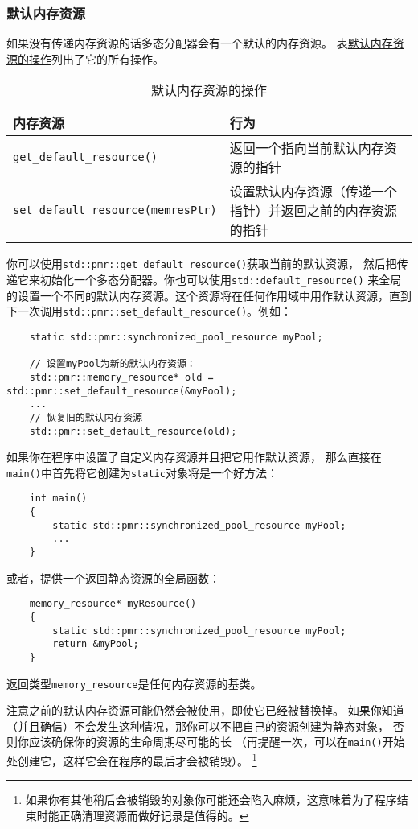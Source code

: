 \subsubsection{默认内存资源}
如果没有传递内存资源的话多态分配器会有一个默认的内存资源。
表\hyperref[t29.2]{默认内存资源的操作}列出了它的所有操作。
\begin{table}[htb]
    \centering
    \begin{tabular}{l|p{}}
        \hline
        \textbf{内存资源}                              & \textbf{行为}                   \\
        \hline
        \texttt{get\_default\_resource()}          & 返回一个指向当前默认内存资源的指针             \\
        \texttt{set\_default\_resource(memresPtr)} & 设置默认内存资源（传递一个指针）并返回之前的内存资源的指针 \\
        \hline
    \end{tabular}
    \caption{默认内存资源的操作}
    \label{t29.2}
\end{table}

你可以使用\texttt{std::pmr::get\_default\_resource()}获取当前的默认资源，
然后把传递它来初始化一个多态分配器。你也可以使用\texttt{std::default\_resource()}
来全局的设置一个不同的默认内存资源。这个资源将在任何作用域中用作默认资源，直到
下一次调用\texttt{std::pmr::set\_default\_resource()}。例如：
\begin{lstlisting}
    static std::pmr::synchronized_pool_resource myPool;

    // 设置myPool为新的默认内存资源：
    std::pmr::memory_resource* old = std::pmr::set_default_resource(&myPool);
    ...
    // 恢复旧的默认内存资源
    std::pmr::set_default_resource(old);
\end{lstlisting}
如果你在程序中设置了自定义内存资源并且把它用作默认资源，
那么直接在\texttt{main()}中首先将它创建为\texttt{static}对象将是一个好方法：
\begin{lstlisting}
    int main()
    {
        static std::pmr::synchronized_pool_resource myPool;
        ...
    }
\end{lstlisting}
或者，提供一个返回静态资源的全局函数：
\begin{lstlisting}
    memory_resource* myResource()
    {
        static std::pmr::synchronized_pool_resource myPool;
        return &myPool;
    }
\end{lstlisting}
返回类型\texttt{memory\_resource}是任何内存资源的基类。

注意之前的默认内存资源可能仍然会被使用，即使它已经被替换掉。
如果你知道（并且确信）不会发生这种情况，那你可以不把自己的资源创建为静态对象，
否则你应该确保你的资源的生命周期尽可能的长
（再提醒一次，可以在\texttt{main()}开始处创建它，这样它会在程序的最后才会被销毁）。
\footnote{如果你有其他稍后会被销毁的对象你可能还会陷入麻烦，这意味着为了程序结束时能正确清理资源而做好记录是值得的。}

